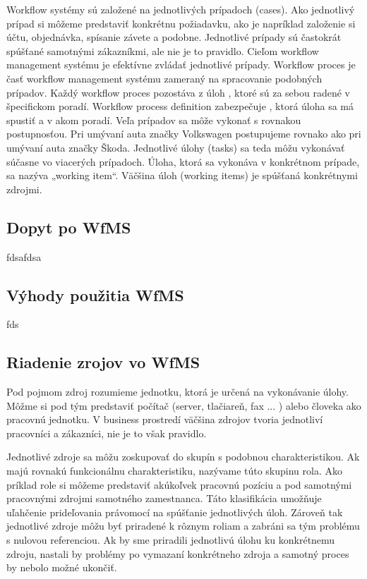 Workflow systémy sú založené na jednotlivých prípadoch (cases). Ako jednotlivý prípad si môžeme predstaviť 	 konkrétnu požiadavku, ako je napríklad založenie si účtu, objednávka, spísanie závete a podobne. Jednotlivé prípady sú častokrát spúšťané samotnými zákazníkmi, ale nie je to pravidlo. Cieľom workflow management systému je efektívne zvládať jednotlivé prípady. Workflow proces je časť workflow management systému zameraný na spracovanie podobných prípadov. Každý workflow proces pozostáva z úloh , ktoré sú za sebou radené v špecifickom poradí. Workflow process definition zabezpečuje , ktorá úloha sa má spustiť a v akom poradí. Veľa prípadov sa môže vykonať s rovnakou postupnosťou. Pri umývaní auta značky Volkswagen postupujeme rovnako ako pri umývaní auta značky Škoda. Jednotlivé úlohy (tasks) sa teda môžu vykonávať súčasne vo viacerých prípadoch. Úloha, ktorá sa vykonáva v konkrétnom prípade, sa nazýva „working item“. Väčšina úloh (working items) je spúšťaná  konkrétnymi zdrojmi. \cite{workflow_systemy}


\subsection{Dopyt po WfMS}
fdsafdsa

\subsection{Výhody použitia WfMS}
fds


\subsection{Riadenie zrojov vo WfMS}
Pod pojmom zdroj rozumieme jednotku, ktorá je určená na vykonávanie úlohy. Môžme si pod tým predstaviť počítač (server, tlačiareň, fax ... ) alebo človeka ako pracovnú jednotku. V business prostredí väčšina zdrojov tvoria jednotliví pracovníci a zákazníci, nie je to však pravidlo.

Jednotlivé zdroje sa môžu zoskupovať do skupín s podobnou charakteristikou. Ak majú rovnakú funkcionálnu charakteristiku, nazývame túto skupinu rola.
Ako príklad role si môžeme predstaviť akúkoľvek pracovnú pozíciu a pod samotnými pracovnými zdrojmi samotného zamestnanca. Táto klasifikácia umožňuje uľahčenie prideľovania právomocí na spúšťanie jednotlivých úloh. Zároveň tak jednotlivé zdroje môžu byť priradené k rôznym roliam a zabráni sa tým problému s nulovou referenciou. Ak by sme priradili jednotlivú úlohu ku konkrétnemu zdroju, nastali by problémy po vymazaní konkrétneho zdroja a samotný proces by nebolo možné ukončiť.


